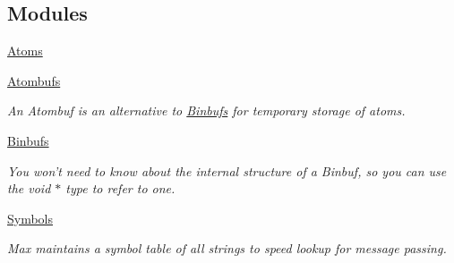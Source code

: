 \subsection*{Modules}
\begin{DoxyCompactItemize}
\item 
\hyperlink{group__atom}{Atoms}
\item 
\hyperlink{group__atombuf}{Atombufs}


\begin{DoxyCompactList}\small\item\em An Atombuf is an alternative to \hyperlink{group__binbuf}{Binbufs} for temporary storage of atoms. \item\end{DoxyCompactList}\item 
\hyperlink{group__binbuf}{Binbufs}


\begin{DoxyCompactList}\small\item\em You won’t need to know about the internal structure of a Binbuf, so you can use the void $\ast$ type to refer to one. \item\end{DoxyCompactList}\item 
\hyperlink{group__symbol}{Symbols}


\begin{DoxyCompactList}\small\item\em Max maintains a symbol table of all strings to speed lookup for message passing. \item\end{DoxyCompactList}\end{DoxyCompactItemize}
